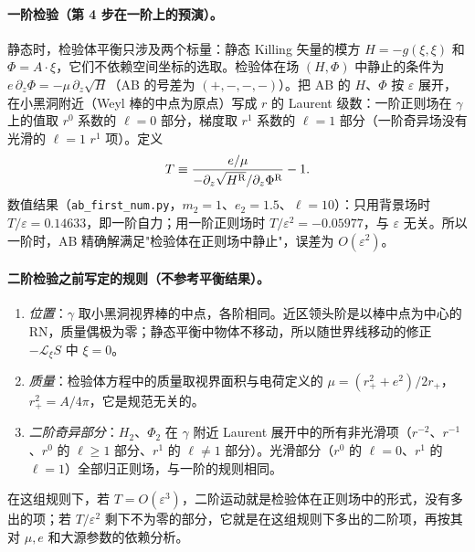 \documentclass[11pt,a4paper]{ctexart}
\numberwithin{equation}{section}
\begin{document}
\paragraph{一阶检验（第 4 步在一阶上的预演）。}静态时，检验体平衡只涉及两个标量：静态 Killing 矢量的模方 $H=-g(\xi,\xi)$ 和 $\Phi=A\cdot\xi$，它们不依赖空间坐标的选取。检验体在场 $(H,\Phi)$ 中静止的条件为 $e\,\partial_z\Phi=-\mu\,\partial_z\sqrt H$（AB 的号差为 $(+,-,-,-)$）。把 AB 的 $H$、$\Phi$ 按 $\varepsilon$ 展开，在小黑洞附近（Weyl 棒的中点为原点）写成 $r$ 的 Laurent 级数：一阶正则场在 $\gamma$ 上的值取 $r^0$ 系数的 $\ell=0$ 部分，梯度取 $r^1$ 系数的 $\ell=1$ 部分（一阶奇异场没有光滑的 $\ell=1$ $r^1$ 项）。定义
\begin{equation*}
T\equiv\frac{e/\mu}{-\partial_z\sqrt{H^{\rm R}}/\partial_z\Phi^{\rm R}}-1 .
\end{equation*}
数值结果（\texttt{ab\_first\_num.py}，$m_2=1$、$e_2=1.5$、$\ell=10$）：只用背景场时 $T/\varepsilon=0.14633$，即一阶自力；用一阶正则场时 $T/\varepsilon^2=-0.05977$，与 $\varepsilon$ 无关。所以一阶时，AB 精确解满足"检验体在正则场中静止"，误差为 $O(\varepsilon^2)$。

\paragraph{二阶检验之前写定的规则（不参考平衡结果）。}
\begin{enumerate}
\item \emph{位置}：$\gamma$ 取小黑洞视界棒的中点，各阶相同。近区领头阶是以棒中点为中心的 RN，质量偶极为零；静态平衡中物体不移动，所以随世界线移动的修正 $-\mathcal L_\xi S$ 中 $\xi=0$。
\item \emph{质量}：检验体方程中的质量取视界面积与电荷定义的 $\mu=(r_+^2+e^2)/2r_+$，$r_+^2=A/4\pi$，它是规范无关的。
\item \emph{二阶奇异部分}：$H_2$、$\Phi_2$ 在 $\gamma$ 附近 Laurent 展开中的所有非光滑项（$r^{-2}$、$r^{-1}$、$r^0$ 的 $\ell\ge1$ 部分、$r^1$ 的 $\ell\ne1$ 部分）。光滑部分（$r^0$ 的 $\ell=0$、$r^1$ 的 $\ell=1$）全部归正则场，与一阶的规则相同。
\end{enumerate}
在这组规则下，若 $T=O(\varepsilon^3)$，二阶运动就是检验体在正则场中的形式，没有多出的项；若 $T/\varepsilon^2$ 剩下不为零的部分，它就是在这组规则下多出的二阶项，再按其对 $\mu,e$ 和大源参数的依赖分析。
\end{document}

